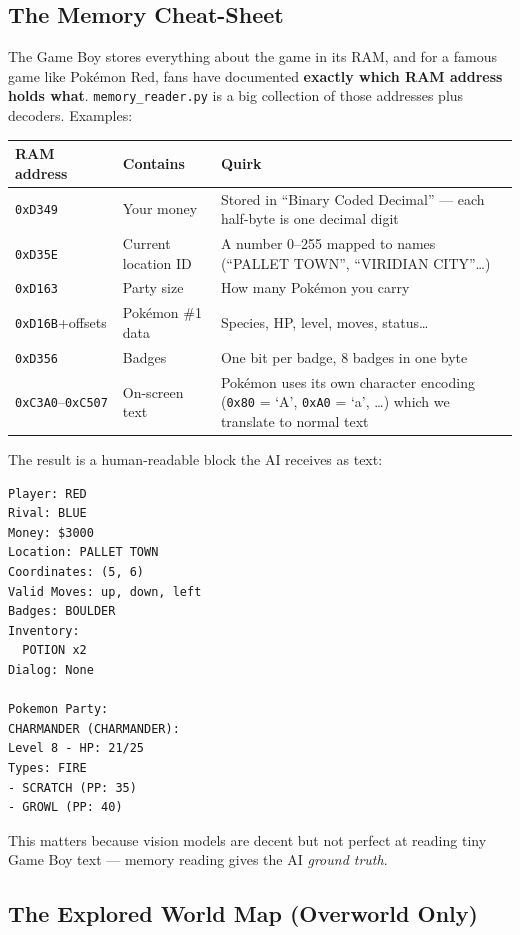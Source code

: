 \documentclass[11pt]{article}
\newcommand{\code}[1]{\texttt{#1}}
\begin{document}
\subsection{The Memory Cheat-Sheet}

The Game Boy stores everything about the game in its RAM, and for a famous game like Pokémon Red, fans have documented \textbf{exactly which RAM address holds what}. \code{memory\_reader.py} is a big collection of those addresses plus decoders. Examples:

\begin{tabularx}{\textwidth}{@{}llX@{}}
\toprule
\textbf{RAM address} & \textbf{Contains} & \textbf{Quirk} \\
\midrule
\code{0xD349} & Your money & Stored in ``Binary Coded Decimal'' --- each half-byte is one decimal digit \\
\code{0xD35E} & Current location ID & A number 0--255 mapped to names (``PALLET TOWN'', ``VIRIDIAN CITY''\ldots) \\
\code{0xD163} & Party size & How many Pokémon you carry \\
\code{0xD16B}+offsets & Pokémon \#1 data & Species, HP, level, moves, status\ldots \\
\code{0xD356} & Badges & One bit per badge, 8 badges in one byte \\
\code{0xC3A0}--\code{0xC507} & On-screen text & Pokémon uses its own character encoding (\code{0x80} = `A', \code{0xA0} = `a', \ldots) which we translate to normal text \\
\bottomrule
\end{tabularx}

\vspace{0.5em}
The result is a human-readable block the AI receives as text:

\begin{verbatim}
Player: RED
Rival: BLUE
Money: $3000
Location: PALLET TOWN
Coordinates: (5, 6)
Valid Moves: up, down, left
Badges: BOULDER
Inventory:
  POTION x2
Dialog: None

Pokemon Party:
CHARMANDER (CHARMANDER):
Level 8 - HP: 21/25
Types: FIRE
- SCRATCH (PP: 35)
- GROWL (PP: 40)
\end{verbatim}

This matters because vision models are decent but not perfect at reading tiny Game Boy text --- memory reading gives the AI \emph{ground truth}.

\subsection{The Explored World Map (Overworld Only)}
\end{document}
